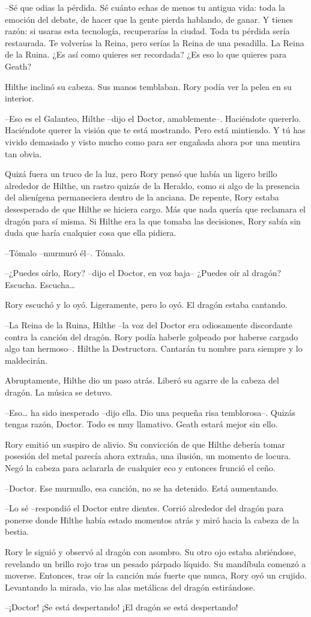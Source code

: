 {--Sé que odias la pérdida. Sé cuánto echas de menos tu antigua vida:
	toda la emoción del debate, de hacer que la gente pierda hablando, de
	ganar. Y tienes razón: si usaras esta tecnología, recuperarías la
	ciudad. Toda tu pérdida sería restaurada. Te volverías la Reina, pero
	serías la Reina de una pesadilla. La Reina de la Ruina. ¿Es así como
quieres ser recordada? ¿Es eso lo que quieres para Geath?}

{Hilthe inclinó su cabeza. Sus manos temblaban. Rory podía ver la pelea
en su interior.}

{--Eso es el Galanteo, Hilthe --dijo el Doctor, amablemente--.
	Haciéndote quererlo. Haciéndote querer la visión que te está mostrando.
	Pero está mintiendo. Y tú has vivido demasiado y visto mucho como para
ser engañada ahora por una mentira tan obvia.}

{Quizá fuera un truco de la luz, pero Rory pensó que había un ligero
	brillo alrededor de Hilthe, un rastro quizás de la Heraldo, como si algo
	de la presencia del alienígena permaneciera dentro de la anciana. De
	repente, Rory estaba desesperado de que Hilthe se hiciera cargo. Más que
	nada quería que reclamara el dragón para sí misma. Si Hilthe era la que
	tomaba las decisiones, Rory sabía sin duda que haría cualquier cosa que
ella pidiera.}

{--Tómalo --murmuró él--. Tómalo.}

{--¿Puedes oírlo, Rory? --dijo el Doctor, en voz baja-- ¿Puedes oír al
	dragón? Escucha. Escucha\ldots{}}

{Rory escuchó y lo oyó. Ligeramente, pero lo oyó. El dragón estaba
cantando.}

{--La Reina de la Ruina, Hilthe --la voz del Doctor era odiosamente
	discordante contra la canción del dragón. Rory podía haberle golpeado
	por haberse cargado algo tan hermoso--. Hilthe la Destructora. Cantarán
tu nombre para siempre y lo maldecirán.}

{Abruptamente, Hilthe dio un paso atrás. Liberó su agarre de la cabeza
del dragón. La música se detuvo.}

{--Eso\ldots{} ha sido inesperado --dijo ella. Dio una pequeña risa
	temblorosa--. Quizás tengas razón, Doctor. Todo es muy llamativo. Geath
estará mejor sin ello.}

{Rory emitió un suspiro de alivio. Su convicción de que Hilthe debería
	tomar posesión del metal parecía ahora extraña, una ilusión, un momento
	de locura. Negó la cabeza para aclararla de cualquier eco y entonces
frunció el ceño.}

{--Doctor. Ese murmullo, esa canción, no se ha detenido. Está
aumentando.}

{--Lo sé --respondió el Doctor entre dientes. Corrió alrededor del
	dragón para ponerse donde Hilthe había estado momentos atrás y miró
hacia la cabeza de la bestia.}

{Rory le siguió y observó al dragón con asombro. Su otro ojo estaba
	abriéndose, revelando un brillo rojo tras un pesado párpado líquido. Su
	mandíbula comenzó a moverse. Entonces, tras oír la canción más fuerte
	que nunca, Rory oyó un crujido. Levantando la mirada, vio las alas
metálicas del dragón estirándose.}

{--¡Doctor! ¡Se está despertando! ¡El dragón se está despertando!}
